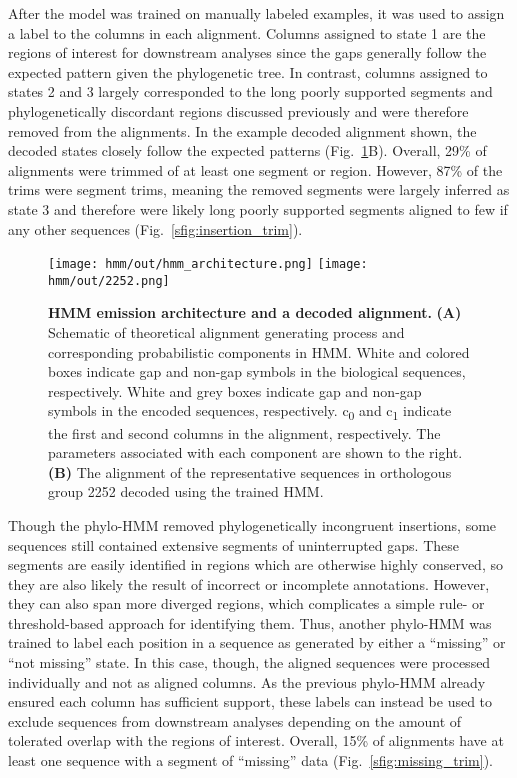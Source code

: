 After the model was trained on manually labeled examples, it was used to assign a label to the columns in each alignment. Columns assigned to state 1 are the regions of interest for downstream analyses since the gaps generally follow the expected pattern given the phylogenetic tree. In contrast, columns assigned to states 2 and 3 largely corresponded to the long poorly supported segments and phylogenetically discordant regions discussed previously and were therefore removed from the alignments. In the example decoded alignment shown, the decoded states closely follow the expected patterns (Fig.~\ref{fig:hmm}B). Overall, 29\% of alignments were trimmed of at least one segment or region. However, 87\% of the trims were segment trims, meaning the removed segments were largely inferred as state 3 and therefore were likely long poorly supported segments aligned to few if any other sequences (Fig.~\ref{sfig:insertion_trim}).

\begin{figure}[h!]
\texttt{[image: hmm/out/hmm\_architecture.png]}
\texttt{[image: hmm/out/2252.png]}
\centering
\caption{\textbf{HMM emission architecture and a decoded alignment.}
\textbf{(A)} Schematic of theoretical alignment generating process and corresponding probabilistic components in HMM. White and colored boxes indicate gap and non-gap symbols in the biological sequences, respectively. White and grey boxes indicate gap and non-gap symbols in the encoded sequences, respectively. c\textsubscript{0} and c\textsubscript{1} indicate the first and second columns in the alignment, respectively. The parameters associated with each component are shown to the right. \textbf{(B)} The alignment of the representative sequences in orthologous group 2252 decoded using the trained HMM.}
\label{fig:hmm}
\end{figure}

Though the phylo-HMM removed phylogenetically incongruent insertions, some sequences still contained extensive segments of uninterrupted gaps. These segments are easily identified in regions which are otherwise highly conserved, so they are also likely the result of incorrect or incomplete annotations. However, they can also span more diverged regions, which complicates a simple rule- or threshold-based approach for identifying them. Thus, another phylo-HMM was trained to label each position in a sequence as generated by either a ``missing'' or ``not missing'' state. In this case, though, the aligned sequences were processed individually and not as aligned columns. As the previous phylo-HMM already ensured each column has sufficient support, these labels can instead be used to exclude sequences from downstream analyses depending on the amount of tolerated overlap with the regions of interest. Overall, 15\% of alignments have at least one sequence with a segment of ``missing'' data (Fig.~\ref{sfig:missing_trim}).

